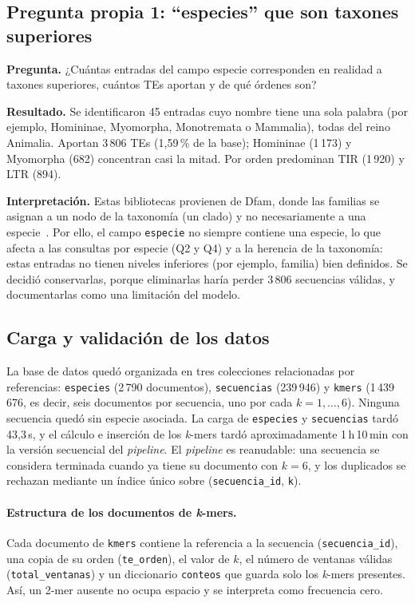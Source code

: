 \subsection*{Pregunta propia 1: ``especies'' que son taxones superiores}

\textbf{Pregunta.} ¿Cuántas entradas del campo especie corresponden en
realidad a taxones superiores, cuántos TEs aportan y de qué órdenes son?

\textbf{Resultado.} Se identificaron 45 entradas cuyo nombre tiene una
sola palabra (por ejemplo, Homininae, Myomorpha, Monotremata o Mammalia),
todas del reino Animalia. Aportan 3\,806 TEs (1,59\,\% de la base);
Homininae (1\,173) y Myomorpha (682) concentran casi la mitad. Por orden
predominan TIR (1\,920) y LTR (894).

\textbf{Interpretación.} Estas bibliotecas provienen de Dfam, donde las
familias se asignan a un nodo de la taxonomía (un clado) y no
necesariamente a una especie~\cite{storer2021dfam}. Por ello, el campo
\texttt{especie} no siempre contiene una especie, lo que afecta a las
consultas por especie (Q2 y Q4) y a la herencia de la taxonomía: estas
entradas no tienen niveles inferiores (por ejemplo, familia) bien definidos.
Se decidió conservarlas, porque eliminarlas haría perder 3\,806 secuencias
válidas, y documentarlas como una limitación del modelo.

\subsection{Carga y validación de los datos}
La base de datos quedó organizada en tres colecciones relacionadas por
referencias: \texttt{especies} (2\,790 documentos), \texttt{secuencias}
(239\,946) y \texttt{kmers} (1\,439\,676, es decir, seis documentos por
secuencia, uno por cada $k=1,\dots,6$). Ninguna secuencia quedó sin
especie asociada. La carga de \texttt{especies} y \texttt{secuencias}
tardó 43{,}3\,s, y el cálculo e inserción de los \textit{k}-mers tardó
aproximadamente 1\,h\,10\,min con la versión secuencial del
\textit{pipeline}. El \textit{pipeline} es reanudable: una secuencia se
considera terminada cuando ya tiene su documento con $k=6$, y los
duplicados se rechazan mediante un índice único sobre
(\texttt{secuencia\_id}, \texttt{k}).
 
\paragraph{Estructura de los documentos de \textit{k}-mers.}
Cada documento de \texttt{kmers} contiene la referencia a la secuencia
(\texttt{secuencia\_id}), una copia de su orden (\texttt{te\_orden}), el
valor de $k$, el número de ventanas válidas (\texttt{total\_ventanas}) y
un diccionario \texttt{conteos} que guarda solo los \textit{k}-mers
presentes. Así, un 2-mer ausente no ocupa espacio y se interpreta como
frecuencia cero.
 
